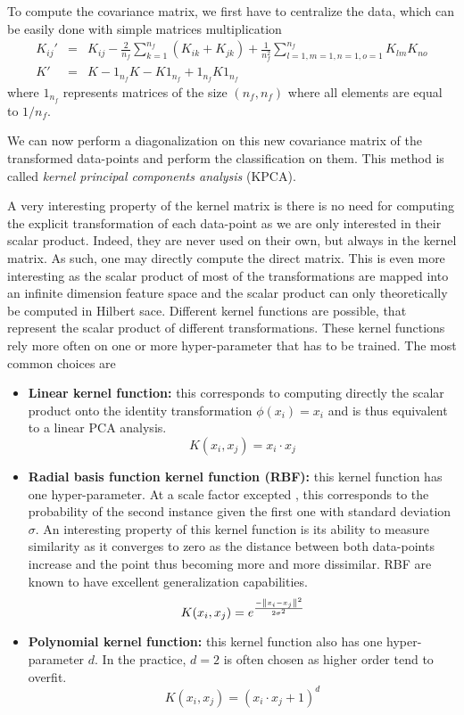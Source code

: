 To compute the covariance matrix, we first have to centralize the data, which can be easily done with simple matrices multiplication
\begin{eqnarray}
    K_{ij}'&=& K_{ij} - \frac{2}{n_f} \sum_{k=1}^{n_f}\left( K_{ik}+K_{jk} \right) + \frac{1}{n_f^2} \sum_{l=1,m=1,n=1,o=1}^{n_f}K_{lm}K_{no} \\
    K' &=& K - 1_{n_f}K - K1_{n_f}+ 1_{n_f}K1_{n_f}
\end{eqnarray}
where $1_{n_f}$ represents matrices of the size $\left( n_f , n_f \right)$ where all elements are equal to $1/n_f$.

We can now perform a diagonalization on this new covariance matrix of the transformed data-points and perform the classification on them. This method is called \emph{kernel principal components analysis} (KPCA). 

A very interesting property of the kernel matrix is there is no need for computing the explicit transformation of each data-point as we are only interested in their scalar product. Indeed, they are never used on their own, but always in the kernel matrix. As such, one may directly compute the direct matrix. This is even more interesting as the scalar product of most of the transformations are mapped into an infinite dimension feature space and the scalar product can only theoretically be computed in Hilbert sace. Different kernel functions are possible, that represent the scalar product of different transformations. These kernel functions rely more often on one or more hyper-parameter that has to be trained. The most common choices are
\begin{itemize}
    \item \textbf{Linear kernel function:} this corresponds to computing directly the scalar product onto the identity transformation $\phi(x_i)=x_i$ and is thus equivalent to a linear PCA analysis.
    \begin{equation}
        K(x_i,x_j) = x_i \cdot x_j
    \end{equation}
    \item \textbf{Radial basis function kernel function (RBF):} this kernel function has one hyper-parameter. At a scale factor excepted , this corresponds to the probability of the second instance given the first one with standard deviation $\sigma$. An interesting property of this kernel function is its ability to measure similarity as it converges to zero as the distance between both data-points increase and the point thus becoming more and more dissimilar. RBF are known to have excellent generalization capabilities.
    \begin{equation}
        K(x_i,x_j) = e^{\frac{-\left\lVert x_i-x_j\right\rVert^2}{2\sigma^2}}
    \end{equation}
    \item \textbf{Polynomial kernel function:} this kernel function also has one hyper-parameter $d$. In the practice, $d=2$ is often chosen as higher order tend to overfit.
    \begin{equation}
        K(x_i,x_j) = (x_i \cdot x_j +1)^d
    \end{equation}
\end{itemize}

